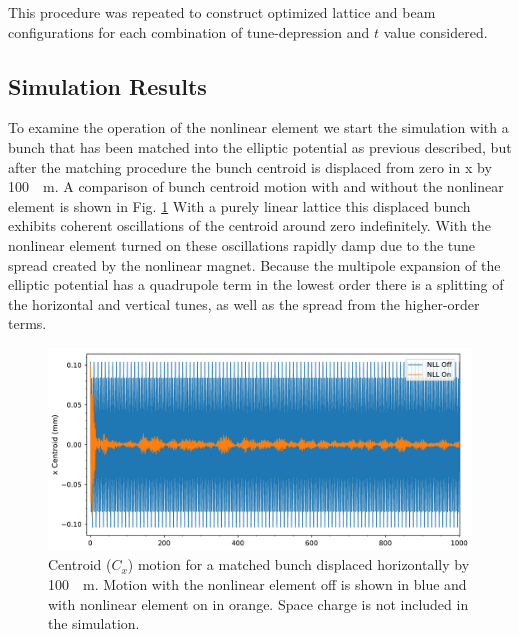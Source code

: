 \documentclass[aps,prstab,twocolumn, groupedaddress]{revtex4-1}
\begin{document}
This procedure was repeated to construct optimized lattice and beam configurations for each combination of tune-depression and $t$ value considered.


\subsection{Simulation Results}
To examine the operation of the nonlinear element we start the simulation with a bunch 
that has been matched into the elliptic potential as previous described, but after the 
matching procedure the bunch centroid is displaced from zero in x by \SI{+100}{\mu m}. A 
comparison of bunch centroid motion with and without the nonlinear element is shown in 
Fig. \ref{fig:nll_on-off} With a purely linear lattice this displaced bunch exhibits coherent 
oscillations of the centroid around zero indefinitely. With the nonlinear element turned on 
these oscillations  rapidly damp due to the tune spread created by the nonlinear magnet. 
Because the multipole expansion of the elliptic potential has a 
quadrupole term in the lowest order there is a splitting of the horizontal and vertical 
tunes, as well as the spread from the higher-order terms. 
\begin{figure}
	\includegraphics[width=\columnwidth]{t_on-off_16um.pdf}%
	\caption{\label{fig:nll_on-off} Centroid ($C_x$) motion for a matched bunch displaced 
	horizontally by \SI{100}{\mu m}. Motion with the nonlinear element off is shown in blue 
	and with nonlinear element on in orange. Space charge is not included in the 
	simulation.}
\end{figure}
\end{document}
